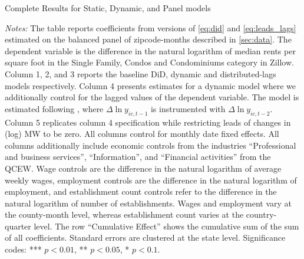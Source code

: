 \begin{table}[h!]\centering
	\caption{Complete Results for Static, Dynamic, and Panel models}
	\label{tab:horse_race_ab}
	\resizebox{.9\textwidth}{!}{
	
	}
	\begin{minipage}{\textwidth} \footnotesize
		\vspace{3mm} 
		\textit{Notes:} The table reports coefficients from versions of \autoref{eq:did} and
		\autoref{eq:leads_lags} estimated on the balanced panel of zipcode-months
		described in \autoref{sec:data}. The dependent variable is the difference in 
		the natural logarithm of median	rents per square foot in the Single Family, Condos 
		and Condominiums category in Zillow. Column 1, 2, and 3 reports the baseline
		DiD, dynamic and distributed-lags models respectively. Column 4 presents estimates
		for a dynamic model where we additionally control for the lagged values of the dependent 
		variable. The model is estimated following \textcite{ArellanoBond1991}, 
		where $\Delta \ln y_{ic, t-1}$ is instrumented with $\Delta \ln y_{ic, t-2}$. Column 5 
		replicates column 4 specification while restricting leads of changes in (log) MW to be zero.
		All columns control for monthly date fixed effects. All columns additionally  
		include economic controls from the industries ``Professional and business services'', 
		``Information'', and ``Financial activities'' from the QCEW. Wage controls are 
		the difference in the natural logarithm of average weekly wages, employment 
		controls are the difference in the natural logarithm of employment, and 
		establishment count controls refer to the difference in the natural logarithm 
		of number of establishments. Wages and employment vary at the county-month level,
		whereas establishment count varies at the country-quarter level. The row 
		``Cumulative Effect'' shows the cumulative 	sum of the sum of all coefficients. 
		Standard errors are clustered at the state level. Significance codes: *** $p < 0.01$, 
		** $p < 0.05$, * $p < 0.1$.
	\end{minipage}
\end{table}


